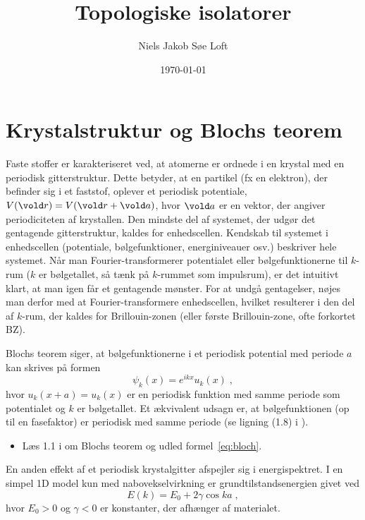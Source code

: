 \documentclass[11pt, a4paper]{article}
\let\v\vold
\newcommand{\v}[1]{{\bf{#1}}}
\begin{document}
\title{Topologiske isolatorer}
\date{\today}

\author{Niels Jakob Søe Loft}

\maketitle


\section{Krystalstruktur og Blochs teorem}

Faste stoffer er karakteriseret ved, at atomerne er ordnede i en
krystal med en periodisk gitterstruktur. Dette betyder, at en partikel
(fx en elektron), der befinder sig i et faststof, oplever et periodisk
potentiale, $V(\v r) = V(\v r + \v a)$, hvor $\v a$ er en vektor, der
angiver periodiciteten af krystallen. Den mindste del af systemet, der
udgør det gentagende gitterstruktur, kaldes for enhedscellen. Kendskab
til systemet i enhedscellen (potentiale, bølgefunktioner,
energiniveauer osv.) beskriver hele systemet. Når man
Fourier-transformerer potentialet eller bølgefunktionerne til $k$-rum
($k$ er bølgetallet, så tænk på $k$-rummet som impulsrum), er det
intuitivt klart, at man igen får et gentagende mønster. For at undgå
gentagelser, nøjes man derfor med at Fourier-transformere
enhedscellen, hvilket resulterer i den del af $k$-rum, der kaldes for
Brillouin-zonen (eller første Brillouin-zone, ofte forkortet BZ).

Blochs teorem siger, at bølgefunktionerne i et periodisk potential med
periode $a$ kan skrives på formen
\begin{equation}
  \label{eq:bloch}
  \psi_k(x) = e^{ikx} u_k(x) \; ,
\end{equation}
hvor $u_k(x+a) = u_k(x)$ er en periodisk funktion med samme periode
som potentialet og $k$ er bølgetallet. Et ækvivalent udsagn er, at
bølgefunktionen (op til en fasefaktor) er periodisk med samme periode
(se ligning (1.8) i \cite{gp}).

\begin{itemize}
\item Læs 1.1 i \cite{gp} om Blochs teorem og udled formel~\eqref{eq:bloch}.
\end{itemize}

En anden effekt af et periodisk krystalgitter afspejler sig i
energispektret. I en simpel 1D model kun med nabovekselvirkning er
grundtilstandsenergien givet ved
\begin{equation}
  \label{eq:tb-energi}
  E(k) = E_0 + 2 \gamma \cos ka \; ,
\end{equation}
hvor $E_0 > 0$ og $\gamma < 0$ er konstanter, der afhænger af
materialet.
\end{document}
